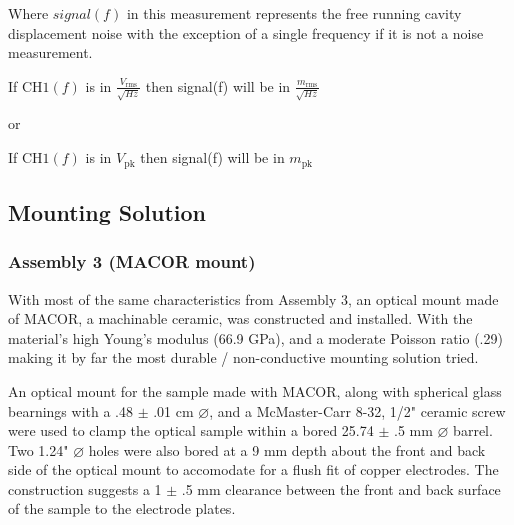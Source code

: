 Where \(signal(f)\) in this measurement represents the free running
cavity displacement noise with the exception of a single frequency if it
is not a noise measurement.

If \(\mathrm{CH1}(f)\) is in \(\frac{V_\mathrm{rms}}{\sqrt{Hz}}\) then
signal(f) will be in \(\frac{m_\mathrm{rms}}{\sqrt{Hz}}\)

or

If \(\mathrm{CH1}(f)\) is in \(V_\mathrm{pk}\) then signal(f) will be in
\(m_\mathrm{pk}\) 
\fi


\subsection{Mounting Solution}

\subsubsection{Assembly 3 (MACOR mount)}
With most of the same characteristics from Assembly 3, an optical mount made of MACOR, a machinable ceramic, was constructed and installed. With the material's high Young's modulus (66.9 GPa), and a moderate Poisson ratio (.29) \cite{macor} making it by far the most durable / non-conductive mounting solution tried.

An optical mount for the sample made with MACOR, along with spherical glass bearnings with a .48 $\pm$ .01 cm $\diameter$, and a McMaster-Carr 8-32, 1/2" ceramic screw were used to clamp the optical sample within a bored 25.74 $\pm$ .5 mm $\diameter$ barrel. Two 1.24" $\diameter$ holes were also bored at a 9 mm depth about the front and back side of the optical mount to accomodate for a flush fit of copper electrodes. The construction suggests a 1 $\pm$ .5 mm clearance between the front and back surface of the sample to the electrode plates.

